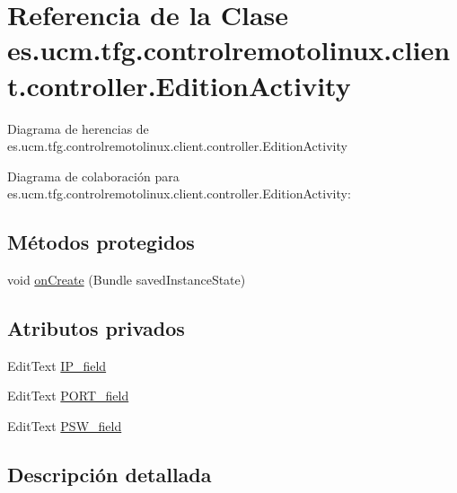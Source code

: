 \hypertarget{classes_1_1ucm_1_1tfg_1_1controlremotolinux_1_1client_1_1controller_1_1EditionActivity}{\section{Referencia de la Clase es.\-ucm.\-tfg.\-controlremotolinux.\-client.\-controller.\-Edition\-Activity}
\label{classes_1_1ucm_1_1tfg_1_1controlremotolinux_1_1client_1_1controller_1_1EditionActivity}
}


Diagrama de herencias de es.\-ucm.\-tfg.\-controlremotolinux.\-client.\-controller.\-Edition\-Activity


Diagrama de colaboración para es.\-ucm.\-tfg.\-controlremotolinux.\-client.\-controller.\-Edition\-Activity\-:
\subsection*{Métodos protegidos}
\begin{DoxyCompactItemize}
\item 
void \hyperlink{classes_1_1ucm_1_1tfg_1_1controlremotolinux_1_1client_1_1controller_1_1EditionActivity_abbd6915565b9fa2c7efee52599f73ff3}{on\-Create} (Bundle saved\-Instance\-State)
\end{DoxyCompactItemize}
\subsection*{Atributos privados}
\begin{DoxyCompactItemize}
\item 
Edit\-Text \hyperlink{classes_1_1ucm_1_1tfg_1_1controlremotolinux_1_1client_1_1controller_1_1EditionActivity_ac3fa85a6c1668243c9fc6703bd38d949}{I\-P\-\_\-field}
\item 
Edit\-Text \hyperlink{classes_1_1ucm_1_1tfg_1_1controlremotolinux_1_1client_1_1controller_1_1EditionActivity_ab46ad3518aec45f6a0c2f7e41e0db0b0}{P\-O\-R\-T\-\_\-field}
\item 
Edit\-Text \hyperlink{classes_1_1ucm_1_1tfg_1_1controlremotolinux_1_1client_1_1controller_1_1EditionActivity_a4521b2b151cf1680726d7f1f4d0b1018}{P\-S\-W\-\_\-field}
\end{DoxyCompactItemize}


\subsection{Descripción detallada}


